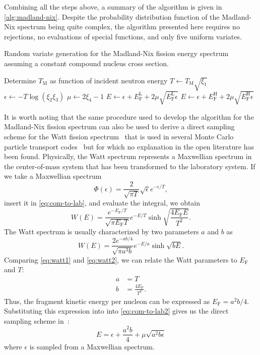 \documentclass[final,leqno,onefignum,onetabnum]{siamltex1213}
\newcommand{\tmax}{T_{\mathrm{M}}}
\newcommand{\ef}{E_{\mathrm{F}}}
\newcommand{\efl}{E_{\mathrm{F}}^{\mathrm{L}}}
\newcommand{\efh}{E_{\mathrm{F}}^{\mathrm{H}}}
\begin{document}
Combining all the steps above, a summary of the algorithm is given in
\autoref{alg:madland-nix}. Despite the probability distribution function of the
Madland-Nix spectrum being quite complex, the algorithm presented here requires
no rejections, no evaluations of special functions, and only five uniform
variates.
\begin{algorithm}
  \caption{Random variate generation for the Madland-Nix fission energy spectrum
    assuming a constant compound nucleus cross section.}
  \label{alg:madland-nix}
  \begin{algorithmic}[1]
    \State Determine $\tmax$ as function of incident neutron energy
    \State $T \gets \tmax \sqrt{\xi_1}$
    \State $\epsilon \gets - T \log(\xi_2 \xi_3)$
    \State $\mu \gets 2\xi_4 - 1$
      \State $E \gets \epsilon + \efl + 2\mu \sqrt{\efl \epsilon}$
    \Else
      \State $E \gets \epsilon + \efh + 2\mu \sqrt{\efh \epsilon}$
    \EndIf
  \end{algorithmic}
\end{algorithm}

It is worth noting that the same procedure used to develop the algorithm for the
Madland-Nix fission spectrum can also be used to derive a direct sampling scheme
for the Watt fission spectrum~\cite{lanl-brown-2005} that is used in several
Monte Carlo particle transport codes~\cite{snamc-griesheimer-2013,
  ane-romano-2013} but for which no explanation in the open literature has been
found. Physically, the Watt spectrum represents a Maxwellian spectrum in the
center-of-mass system that has been transformed to the laboratory system. If we
take a Maxwellian spectrum
\begin{equation*}
  \Phi(\epsilon) = \frac{2}{\sqrt{\pi T}} \sqrt{\epsilon} e^{-\epsilon/T},
\end{equation*}
insert it in \eqref{eq:com-to-lab}, and evaluate the integral, we obtain
\begin{equation}
  W(E) = \frac{e^{-\ef/T}}{\sqrt{\pi \ef T}} e^{-E/T} \sinh \sqrt{\frac{4\ef
      E}{T^2}}.
  \label{eq:watt1}
\end{equation}
The Watt spectrum is usually characterized by two parameters $a$ and $b$ as
\begin{equation}
  W(E) = \frac{2e^{-ab/4}}{\sqrt{\pi a^3 b}} e^{-E/a} \sinh \sqrt{bE}.
  \label{eq:watt2}
\end{equation}
Comparing \eqref{eq:watt1} and \eqref{eq:watt2}, we can relate the Watt
parameters to $\ef$ and $T$:
\begin{align*}
  a &= T \\
  b &= \frac{4\ef}{T^2}.
\end{align*}
Thus, the fragment kinetic energy per nucleon can be expressed as $\ef =
a^2b/4$. Substituting this expression into into \eqref{eq:com-to-lab2} gives us
the direct sampling scheme in~\cite{lanl-brown-2005}:
\begin{equation*}
  E = \epsilon + \frac{a^2b}{4} + \mu \sqrt{a^2 b \epsilon}
\end{equation*}
where $\epsilon$ is sampled from a Maxwellian spectrum.
\end{document}
